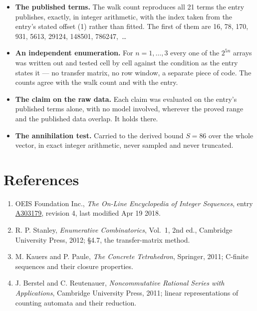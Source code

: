 \documentclass[11pt]{article}
\theoremstyle{definition}
\begin{document}
\begin{itemize}

\item {\bfseries The published terms.} The walk count reproduces all 21 terms the entry publishes, exactly, in integer arithmetic, with the index taken from the entry's stated offset (1) rather than fitted. The first of them are 16, 78, 170, 931, 5613, 29124, 148501, 786247,~\dots

\item {\bfseries An independent enumeration.} For $n = 1,\dots,3$ every one of the $2^{5n}$ arrays was written out and tested cell by cell against the condition as the entry states it --- no transfer matrix, no row window, a separate piece of code. The counts agree with the walk count and with the entry.

\item {\bfseries The claim on the raw data.} Each claim was evaluated on the entry's published terms alone, with no model involved, wherever the proved range and the published data overlap. It holds there.

\item {\bfseries The annihilation test.} Carried to the derived bound $S = 86$ over the whole vector, in exact integer arithmetic, never sampled and never truncated.

\end{itemize}

\section{References}

\begin{enumerate}

\item OEIS Foundation Inc., \emph{The On-Line Encyclopedia of Integer Sequences}, entry \href{https://oeis.org/A303179}{A303179}, revision 4, last modified Apr 19 2018.

\item R. P. Stanley, \emph{Enumerative Combinatorics}, Vol.~1, 2nd ed., Cambridge University Press, 2012; \S4.7, the transfer-matrix method.

\item M. Kauers and P. Paule, \emph{The Concrete Tetrahedron}, Springer, 2011; C-finite sequences and their closure properties.

\item J. Berstel and C. Reutenauer, \emph{Noncommutative Rational Series with Applications}, Cambridge University Press, 2011; linear representations of counting automata and their reduction.

\end{enumerate}
\end{document}
